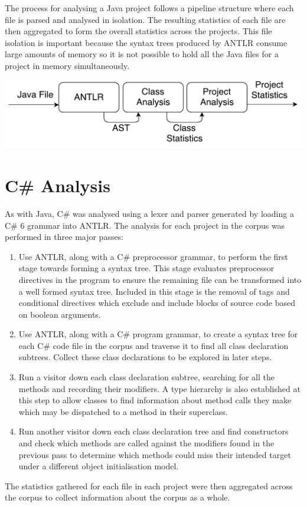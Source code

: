 The process for analysing a Java project follows a pipeline structure where each file is parsed and analysed in isolation. The resulting statistics of each file are then aggregated to form the overall statistics across the projects. This file isolation is important because the syntax trees produced by ANTLR consume large amounts of memory so it is not possible to hold all the Java files for a project in memory simultaneously.
\newline

\begin{center}
	\includegraphics[scale=0.70]{AntlrPipeline.pdf}
\end{center}

\section{C\# Analysis}
As with Java, C\# was analysed using a lexer and parser generated by loading a C\# 6 grammar into ANTLR. The analysis for each project in the corpus was performed in three major passes:
\begin{enumerate}
	\item Use ANTLR, along with a C\# preprocessor grammar, to perform the first stage towards forming a syntax tree. This stage evaluates preprocessor directives in the program to ensure the remaining file can be transformed into a well formed syntax tree. Included in this stage is the removal of  tags and conditional directives which exclude and include blocks of source code based on boolean arguments.
	\item Use ANTLR, along with a C\# program grammar, to create a syntax tree for each C\# code file in the corpus and traverse it to find all class declaration subtrees. Collect these class declarations to be explored in later steps.
	\item Run a visitor down each class declaration subtree, searching for all the methods and recording their modifiers. A type hierarchy is also established at this step to allow classes to find information about method calls they make which may be dispatched to a method in their superclass.
	\item Run another visitor down each class declaration tree and find constructors and check which methods are called against the modifiers found in the previous pass to determine which methods could miss their intended target under a different object initialisation model.
\end{enumerate}
The statistics gathered for each file in each project were then aggregated across the corpus to collect information about the corpus as a whole.

